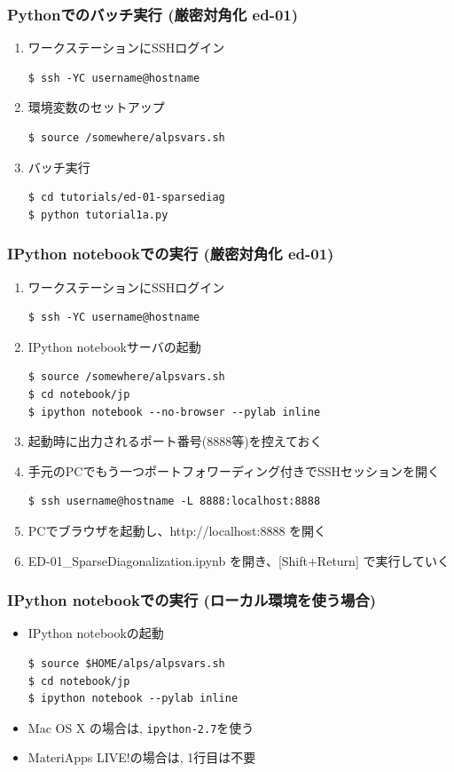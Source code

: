 \begin{frame}[t,fragile]
  \frametitle{Pythonでのバッチ実行 (厳密対角化 ed-01)}
  \begin{enumerate}
  \item ワークステーションにSSHログイン
\begin{lstlisting}
$ ssh -YC username@hostname
\end{lstlisting}
  \item 環境変数のセットアップ
\begin{lstlisting}
$ source /somewhere/alpsvars.sh
\end{lstlisting}
  \item バッチ実行
\begin{lstlisting}
$ cd tutorials/ed-01-sparsediag
$ python tutorial1a.py
\end{lstlisting}
  \end{enumerate}
\end{frame}

\begin{frame}[t,fragile,shrink=10]
  \frametitle{IPython notebookでの実行 (厳密対角化 ed-01)}
  \begin{enumerate}
  \item ワークステーションにSSHログイン
\begin{lstlisting}
$ ssh -YC username@hostname
\end{lstlisting}
  \item IPython notebookサーバの起動
\begin{lstlisting}
$ source /somewhere/alpsvars.sh
$ cd notebook/jp
$ ipython notebook --no-browser --pylab inline
\end{lstlisting}
  \item 起動時に出力されるポート番号(8888等)を控えておく
  \item 手元のPCでもう一つポートフォワーディング付きでSSHセッションを開く
\begin{lstlisting}
$ ssh username@hostname -L 8888:localhost:8888
\end{lstlisting}
  \item PCでブラウザを起動し、http://localhost:8888 を開く
  \item ED-01\_SparseDiagonalization.ipynb を開き、[Shift+Return] で実行していく
  \end{enumerate}
\end{frame}

\begin{frame}[t,fragile]
  \frametitle{IPython notebookでの実行 (ローカル環境を使う場合)}
  \begin{itemize}
    \setlength{\itemsep}{1em}
  \item IPython notebookの起動
\begin{lstlisting}
$ source $HOME/alps/alpsvars.sh
$ cd notebook/jp
$ ipython notebook --pylab inline
\end{lstlisting}
  \item Mac OS X の場合は, {\tt ipython-2.7}を使う
  \item MateriApps LIVE!の場合は, 1行目は不要
  \end{itemize}
\end{frame}

